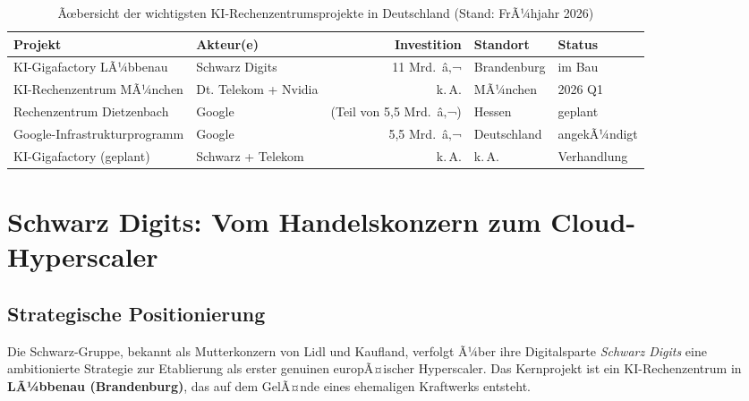 ﻿\documentclass[12pt, a4paper, openany]{report}
\begin{document}
\begin{table}
	\centering
	\caption{Ãœbersicht der wichtigsten KI-Rechenzentrumsprojekte in Deutschland (Stand: FrÃ¼hjahr 2026)}
	\label{tab:rechenzentren_projekte}
	\begin{tabularx}{\textwidth}{l l r l l}
		\toprule
		\textbf{Projekt} & \textbf{Akteur(e)} & \textbf{Investition} & \textbf{Standort} & \textbf{Status} \\
		\midrule
		KI-Gigafactory LÃ¼bbenau & Schwarz Digits & 11 Mrd.\ â‚¬ & Brandenburg & im Bau \\
		KI-Rechenzentrum MÃ¼nchen & Dt. Telekom + Nvidia & k.\,A. & MÃ¼nchen & 2026 Q1 \\
		Rechenzentrum Dietzenbach & Google & (Teil von 5,5 Mrd.\ â‚¬) & Hessen & geplant \\
		Google-Infrastrukturprogramm & Google & 5,5 Mrd.\ â‚¬ & Deutschland & angekÃ¼ndigt \\
		KI-Gigafactory (geplant) & Schwarz + Telekom & k.\,A. & k.\,A. & Verhandlung \\
		\bottomrule
	\end{tabularx}
\end{table}

\section{Schwarz Digits: Vom Handelskonzern zum Cloud-Hyperscaler}
\label{sec:schwarz_digits}

\subsection{Strategische Positionierung}

Die Schwarz-Gruppe, bekannt als Mutterkonzern von Lidl und Kaufland, verfolgt
Ã¼ber ihre Digitalsparte \textit{Schwarz Digits} eine ambitionierte Strategie
zur Etablierung als erster genuinen europÃ¤ischer Hyperscaler. Das Kernprojekt
ist ein KI-Rechenzentrum in \textbf{LÃ¼bbenau (Brandenburg)}, das auf dem
GelÃ¤nde eines ehemaligen Kraftwerks entsteht.
\end{document}
